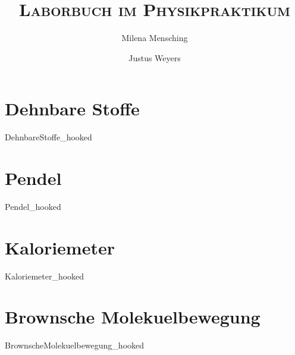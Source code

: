 

\title{\textsc{Laborbuch im Physikpraktikum}}
\author{Milena Mensching \and Justus Weyers}


	\maketitle
	\newpage	
    \tableofcontents
    \newpage
    
    \part{Dehnbare Stoffe}
	{DehnbareStoffe_hooked}
	
	\part{Pendel}
	{Pendel_hooked}

	\part{Kaloriemeter}
	{Kaloriemeter_hooked}
	
	\part{Brownsche Molekuelbewegung}
	{BrownscheMolekuelbewegung_hooked}
	
	\newpage
    
    
	\newpage
	\listoffigures
	\listoftables

